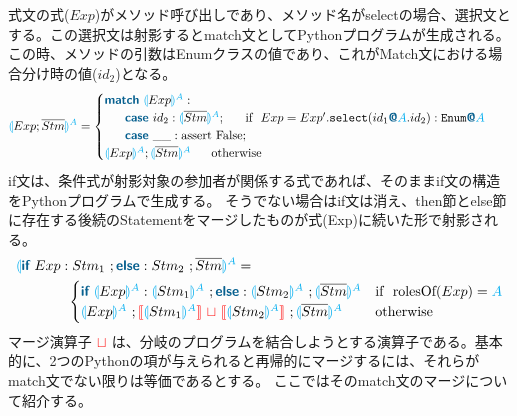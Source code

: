 \documentclass{thesis}
\newcommand{\projection}[2]{{\color{cyan}\llparenthesis}#1{\color{cyan}\rrparenthesis^#2}}
\newcommand{\mblue}[1]{\textbf{\textsf{\color{MidnightBlue}#1}}}
\newcommand{\cyan}[1]{\color{cyan}#1}
\newcommand{\nl}[1]{{\color{red}{\llbracket}}#1{\color{red}{\rrbracket}}} %
\newcommand{\mg}{~{\color{red}{\sqcup}}~} %
\begin{document}
式文の式($Exp$)がメソッド呼び出しであり、メソッド名が\textsf{select}の場合、選択文とする。この選択文は射影するとmatch文としてPythonプログラムが生成される。
この時、メソッドの引数はEnumクラスの値であり、これがMatch文における場合分け時の値($id_2$)となる。
\begin{alignat*}{2} 
  &\projection{Exp;\overline{Stm}}{A} =
  \begin{cases}
    \mblue{match} ~\projection{Exp}{A}: \\
    ~~~~~\mblue{case} ~id_2: \projection{\overline{Stm}}{A};~~~~~ \text{if}~~Exp = Exp'.\texttt{select}(id_1\mblue{@}{\cyan{A}}.id_2):\texttt{Enum}\mblue{@}{\cyan{A}}\\ %
    ~~~~~\mblue{case} ~\_\_: \text{assert False}; \\
    \projection{Exp}{A};\projection{\overline{Stm}}{A} ~~~~~ \text{otherwise}\\
  \end{cases}
\end{alignat*}
if文は、条件式が射影対象の参加者が関係する式であれば、そのままif文の構造をPythonプログラムで生成する。
そうでない場合はif文は消え、then節とelse節に存在する後続のStatementをマージしたものが式(Exp)に続いた形で射影される。
\begin{alignat*}{2} 
  &\projection{\mblue{if}~Exp:Stm_1~;\mblue{else}:Stm_2 ~;\overline{Stm}}{A}=\\
  &
  ~~~~~~~~~~~\begin{cases}
    \mblue{if}~\projection{Exp}{A} : \projection{Stm_1}{A} ~; \mblue{else}:\projection{Stm_2}{A} ~;\projection{\overline{Stm}}{A} & \text{if}~~ \text{rolesOf}(Exp) = \cyan{A}\\
    \projection{Exp}{A} ~; \nl{\projection{Stm_1}{A}} \mg \nl{\projection{Stm_2}{A}} ~;\projection{\overline{Stm}}{A} & \text{otherwise}
  \end{cases}\\
\end{alignat*}
マージ演算子$\mg$は、分岐のプログラムを結合しようとする演算子である。基本的に、2つのPythonの項が与えられると再帰的にマージするには、それらがmatch文でない限りは等価であるとする。
ここではそのmatch文のマージについて紹介する。
\end{document}
